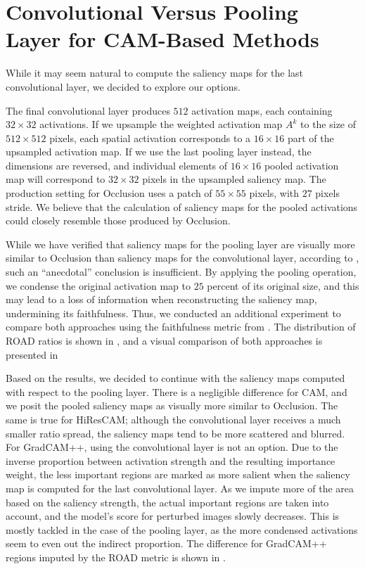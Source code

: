\pagebreak

\section{Convolutional Versus Pooling Layer for CAM-Based Methods}\label{sec:conv-vs-pool}

While it may seem natural to compute the saliency maps for the last convolutional layer, we decided to explore our options.

The final convolutional layer produces $512$ activation maps, each containing $32 \times 32$ activations.
If we upsample the weighted activation map $A^k$ to the size of $512 \times 512$ pixels, each spatial activation corresponds to a $16 \times 16$ part of the upsampled activation map.
If we use the last pooling layer instead, the dimensions are reversed, and individual elements of $16 \times 16$ pooled activation map will correspond to $32 \times 32$ pixels in the upsampled saliency map.
The production setting for Occlusion uses a patch of $55 \times 55$ pixels, with $27$ pixels stride.
We believe that the calculation of saliency maps for the pooled activations could closely resemble those produced by Occlusion.

While we have verified that saliency maps for the pooling layer are visually more similar to Occlusion than saliency maps for the convolutional layer, according to \cite{xai-anecdotal-evidence}, such an ``anecdotal'' conclusion is insufficient.
By applying the pooling operation, we condense the original activation map to $25$ percent of its original size, and this may lead to a loss of information when reconstructing the saliency map, undermining its faithfulness.
Thus, we conducted an additional experiment to compare both approaches using the faithfulness metric from .
The distribution of ROAD ratios is shown in , and a visual comparison of both approaches is presented in 

Based on the results, we decided to continue with the saliency maps computed with respect to the pooling layer.
There is a negligible difference for CAM, and we posit the pooled saliency maps as visually more similar to Occlusion.
The same is true for HiResCAM; although the convolutional layer receives a much smaller ratio spread, the saliency maps tend to be more scattered and blurred.
For GradCAM++, using the convolutional layer is not an option.
Due to the inverse proportion between activation strength and the resulting importance weight, the less important regions are marked as more salient when the saliency map is computed for the last convolutional layer.
As we impute more of the area based on the saliency strength, the actual important regions are taken into account, and the model's score for perturbed images slowly decreases.
This is mostly tackled in the case of the pooling layer, as the more condensed activations seem to even out the indirect proportion. 
The difference for GradCAM++ regions imputed by the ROAD metric is shown in .

